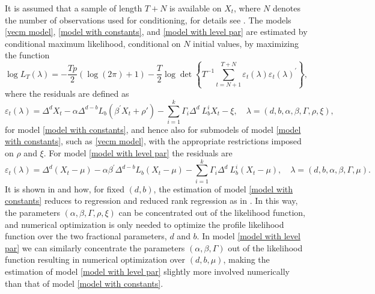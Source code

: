 \documentclass[article]{jss}
\begin{document}
It is assumed that a sample of length $T+N$ is available on $X_t$, where $N$ denotes the number of observations used for conditioning, for details see \cite{johansen2014initial}. The models \eqref{vecm model}, \eqref{model with constants}, and \eqref{model with level par} are estimated by conditional maximum likelihood, conditional on $N$ initial values, by maximizing the function
\begin{equation}
\log L_{T}(\lambda ) = - \frac{T p}{2} ( \log(2\pi) + 1) 
-\frac{T}{2}\log \det \left\{ T^{-1}\sum_{t=N+1}^{T+N}\varepsilon _{t}(\lambda )\varepsilon _{t}(\lambda)^{\prime }\right\},  \label{Cond Like}
\end{equation}
where the residuals are defined as
\begin{equation}
\varepsilon _{t}(\lambda ) = \Delta^{d}X_{t}- \alpha \Delta^{d-b} L_{b} (\beta^{\prime} X_{t} + \rho') 
 - \sum_{i=1}^{k}\Gamma_{i}\Delta^{d}\ L_{b}^{i}X_{t} - \xi, \quad
\lambda =(d,b,\alpha,\beta,\Gamma,\rho,\xi),
\label{epstau}
\end{equation}
for model \eqref{model with constants}, and hence also for submodels of model \eqref{model with constants}, such as \eqref{vecm model}, with the appropriate restrictions imposed on $\rho$ and $\xi$. For model \eqref{model with level par} the residuals are
\begin{equation}
\varepsilon _{t}(\lambda ) = \Delta^{d}(X_{t}-\mu) -  \alpha \beta^{\prime} \Delta^{d-b} L_{b} (X_{t} - \mu) 
 - \sum_{i=1}^{k}\Gamma_{i}\Delta^{d}\ L_{b}^{i}(X_{t} - \mu), \quad
\lambda =(d,b,\alpha,\beta,\Gamma,\mu).
\label{epstau level}
\end{equation}
It is shown in \cite{johansen2012likelihood} and \cite{Dolatabadi2014} how, for fixed $(d,b)$, the estimation of model \eqref{model with constants} reduces to regression and reduced rank regression as in \cite{Johansen1995}. In this way, the parameters $(\alpha ,\beta,\Gamma,\rho,\xi)$ can be concentrated out of the likelihood function, and numerical optimization is only needed to optimize the profile likelihood function over the two fractional parameters, $d$ and $b$. In model \eqref{model with level par} we can similarly concentrate the parameters $(\alpha ,\beta,\Gamma)$ out of the likelihood function resulting in numerical optimization over $(d,b,\mu)$, making the estimation of model \eqref{model with level par} slightly more involved numerically than that of model \eqref{model with constants}.
\end{document}
